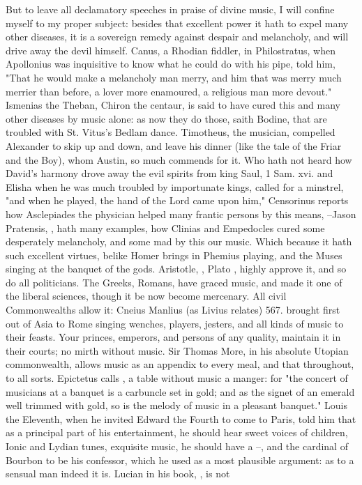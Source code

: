 {But to leave all declamatory speeches in praise of divine music, I will confine myself to my proper subject: besides that excellent power it hath to expel many other diseases, it is a sovereign remedy against despair and melancholy, and will drive away the devil himself. Canus, a Rhodian fiddler, in Philostratus, when Apollonius was inquisitive to know what he could do with his pipe, told him, "That he would make a melancholy man merry, and him that was merry much merrier than before, a lover more enamoured, a religious man more devout." Ismenias the Theban, Chiron the centaur, is said to have cured this and many other diseases by music alone: as now they do those, saith Bodine, that are troubled with St. Vitus's Bedlam dance. Timotheus, the musician, compelled Alexander to skip up and down, and leave his dinner (like the tale of the Friar and the Boy), whom Austin,  so much commends for it. Who hath not heard how David's harmony drove away the evil spirits from king Saul, 1 Sam. xvi. and Elisha when he was much troubled by importunate kings, called for a minstrel, "and when he played, the hand of the Lord came upon him,"  Censorinus  reports how Asclepiades the physician helped many frantic persons by this means,  --Jason Pratensis, , hath many examples, how Clinias and Empedocles cured some desperately melancholy, and some mad by this our music. Which because it hath such excellent virtues, belike Homer brings in Phemius playing, and the Muses singing at the banquet of the gods. Aristotle, , Plato , highly approve it, and so do all politicians. The Greeks, Romans, have graced music, and made it one of the liberal sciences, though it be now become mercenary. All civil Commonwealths allow it: Cneius Manlius (as Livius relates)  567. brought first out of Asia to Rome singing wenches, players, jesters, and all kinds of music to their feasts. Your princes, emperors, and persons of any quality, maintain it in their courts; no mirth without music. Sir Thomas More, in his absolute Utopian commonwealth, allows music as an appendix to every meal, and that throughout, to all sorts. Epictetus calls , a table without music a manger: for "the concert of musicians at a banquet is a carbuncle set in gold; and as the signet of an emerald well trimmed with gold, so is the melody of music in a pleasant banquet."  Louis the Eleventh, when he invited Edward the Fourth to come to Paris, told him that as a principal part of his entertainment, he should hear sweet voices of children, Ionic and Lydian tunes, exquisite music, he should have a --, and the cardinal of Bourbon to be his confessor, which he used as a most plausible argument: as to a sensual man indeed it is. Lucian in his book, , is not }
